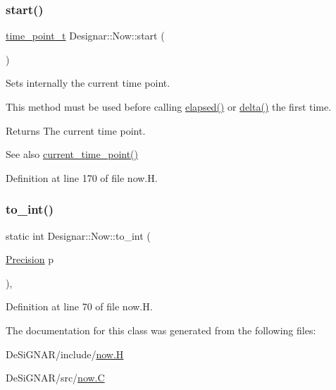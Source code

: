 \subsubsection{\texorpdfstring{start()}{start()}}
{\footnotesize\ttfamily \hyperlink{namespace_designar_a0edbd598eadb672df2c70e5af4dfccee}{time\+\_\+point\+\_\+t} Designar\+::\+Now\+::start (\begin{DoxyParamCaption}{ }\end{DoxyParamCaption})\hspace{0.3cm}{\ttfamily [inline]}}

Sets internally the current time point.

This method must be used before calling \hyperlink{class_designar_1_1_now_a3219d85172fc9628ef90f66c1d69a8e0}{elapsed()} or \hyperlink{class_designar_1_1_now_ae2a46a7ff8392fbadc9fb28ee17f7f5a}{delta()} the first time.

\begin{DoxyReturn}{Returns}
The current time point. 
\end{DoxyReturn}
\begin{DoxySeeAlso}{See also}
\hyperlink{class_designar_1_1_now_af862bb15a2202e02e31a1d11fac08dcf}{current\+\_\+time\+\_\+point()} 
\end{DoxySeeAlso}


Definition at line 170 of file now.\+H.

\mbox{\label{class_designar_1_1_now_a24c5b1e6f6d2e7d8030fd4b70a9a1b12}} 
\subsubsection{\texorpdfstring{to\+\_\+int()}{to\_int()}}
{\footnotesize\ttfamily static int Designar\+::\+Now\+::to\+\_\+int (\begin{DoxyParamCaption}\item[{\hyperlink{class_designar_1_1_now_a3c9f5e57907c88cbe63c70a64638c072}{Precision}}]{p }\end{DoxyParamCaption})\hspace{0.3cm}{\ttfamily [inline]}, {\ttfamily [static]}}



Definition at line 70 of file now.\+H.



The documentation for this class was generated from the following files\+:\begin{DoxyCompactItemize}
\item 
De\+Si\+G\+N\+A\+R/include/\hyperlink{now_8_h}{now.\+H}\item 
De\+Si\+G\+N\+A\+R/src/\hyperlink{now_8_c}{now.\+C}\end{DoxyCompactItemize}
